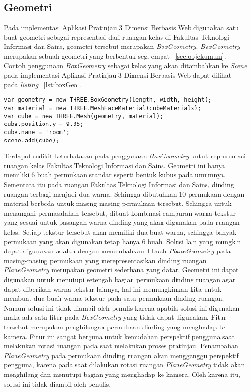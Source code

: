 \subsection{Geometri}
Pada implementasi Aplikasi Pratinjau 3 Dimensi Berbasis Web digunakan satu buat geometri sebagai representasi dari ruangan kelas di Fakultas Teknologi Informasi dan Sains, geometri tersebut merupakan {\it BoxGeometry}. {\it BoxGeometry} merupakan sebuah geometri yang berbentuk segi empat ~\ref{sec:objekumum}. Contoh penggunaan {\it BoxGeometry} sebagai kelas yang akan ditambahkan ke {\it Scene} pada implementasi Aplikasi Pratinjau 3 Dimensi Berbasis Web dapat dilihat pada {\it listing} ~\ref{lst:boxGeo}.
\begin{lstlisting}[caption={Contoh penggunaan {\it BoxGeometry}}, label={lst:boxGeo},captionpos=b]
var geometry = new THREE.BoxGeometry(length, width, height);
var material = new THREE.MeshFaceMaterial(cubeMaterials);
var cube = new THREE.Mesh(geometry, material);
cube.position.y = 9.05;
cube.name = 'room';
scene.add(cube);
\end{lstlisting}
Terdapat sedikit keterbatasan pada penggunaan {\it BoxGeometry} untuk representasi ruangan kelas Fakultas Teknologi Informasi dan Sains. Geometri ini hanya memiliki 6 buah permukaan standar seperti bentuk kubus pada umumnya. Sementara itu pada ruangan Fakultas Teknologi Informasi dan Sains, dinding ruangan terbagi menjadi dua warna. Sehingga dibutuhkan 10 permukaan dengan material berbeda untuk masing-masing permukaan tersebut. Sehingga untuk menangani permasalahan tersebut, dibuat kombinasi campuran warna tekstur yang sesuai untuk pasangan warna dinding yang akan digunakan pada ruangan kelas. Setiap tekstur tersebut akan memiliki dua buat warna, sehingga banyak permukaan yang akan digunakan tetap hanya 6 buah.
Solusi lain yang mungkin dapat digunakan adalah dengan menambahkan 4 buah {\it PlaneGeometry} pada masing-masing permukaan yang merepresentasikan dinding ruangan. {\it PlaneGeometry} merupakan geometri sederhana yang datar. Geometri ini dapat digunakan untuk menutupi setengah bagian permukaan dinding ruangan agar dapat diberikan warna tekstur lainnya, hal ini memungkinkan kita untuk membuat dua buah warna tekstur pada satu permukaan dinding ruangan. Namun solusi ini tidak diambil oleh penulis karena apabila solusi ini digunakan maka ada satu fitur pada {\it BoxGeometry} yang tidak dapat digunakan. Fitur tersebut merupakan penghilangan permukaan dinding yang menghadap ke kamera. Fitur ini sangat berguna untuk kemudahan perspektif pengguna saat melakukan rotasi ruangan pada saat melakukan proses pratinjau. Penambahan {\it PlaneGeometry} pada permukaan dinding ruangan akan mengganggu perspektif pengguna, karena pada saat dilakukan rotasi ruangan {\it PlaneGeometry} tidak akan menghilang dan menutupi bagian yang menghadap ke kamera. Oleh karena itu, solusi ini tidak diambil oleh penulis.

